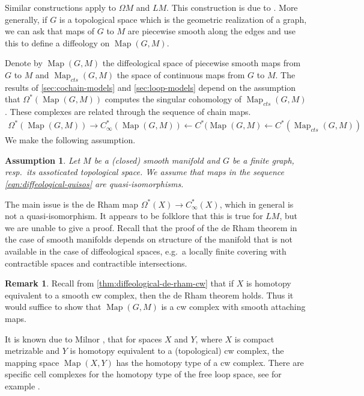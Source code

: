 \documentclass{scrartcl}
\theoremstyle{plain}
\newtheorem{assumption}[theorem]{Assumption}
\theoremstyle{definition}
\newtheorem{remark}[theorem]{Remark}
\newcommand{\from}{\leftarrow}
\DeclareMathOperator{\Map}{Map}
\begin{document}
Similar constructions apply to $\Omega M$ and $LM$. This construction is due to \cite{gugenheim1977chen}. More generally, if $G$ is a topological space which is the geometric realization of a graph, we can ask that maps of $G$ to $M$ are piecewise smooth along the edges and use this to define a diffeology on $\Map(G, M)$.

Denote by $\Map(G, M)$ the diffeological space of piecewise smooth maps from $G$ to $M$ and $\Map_{cts}(G, M)$ the space of continuous maps from $G$ to $M$. The results of \cref{sec:cochain-models} and \cref{sec:loop-models} depend on the assumption that $\Omega^*(\Map(G, M))$ computes the singular cohomology of $\Map_{cts}(G, M)$. These complexes are related through the sequence of chain maps. 
\begin{align}
    \Omega^*(\Map(G, M)) \to C_\infty^*(\Map(G, M)) \from C^*(\Map(G, M)\from C^*(\Map_{cts}(G, M)) \label{eqn:diffeological-quisos}
\end{align}
We make the following assumption. 
\begin{assumption}\label{assumption}
    Let $M$ be a (closed) smooth manifold and $G$ be a finite graph, resp.\ its assoticated topological space. We assume that maps in the sequence \ref{eqn:diffeological-quisos} are quasi-isomorphisms.
\end{assumption}

The main issue is the de Rham map $\Omega^*(X) \to C_\infty^*(X)$, which in general is not a quasi-isomorphism. It appears to be folklore that this is true for $LM$, but we are unable to give a proof. Recall that the proof of the de Rham theorem in the case of smooth manifolds depends on structure of the manifold that is not available in the case of diffeological spaces, e.g.\ a locally finite covering with contractible spaces and contractible intersections. 

\begin{remark}
    Recall from \cref{thm:diffeological-de-rham-cw} that if $X$ is homotopy equivalent to a smooth cw complex, then the de Rham theorem holds. Thus it would suffice to show that $\Map(G, M)$ is a cw complex with smooth attaching maps.

    It is known due to Milnor \cite{milnor1959spaces}, that for spaces $X$ and $Y$, where $X$ is compact metrizable and $Y$ is homotopy equivalent to a (topological) cw complex, the mapping space $\Map(X, Y)$ has the homotopy type of a cw complex. There are specific cell complexes for the homotopy type of the free loop space, see for example \cite{rivera2018combinatorial}. 
\end{remark}
\end{document}

